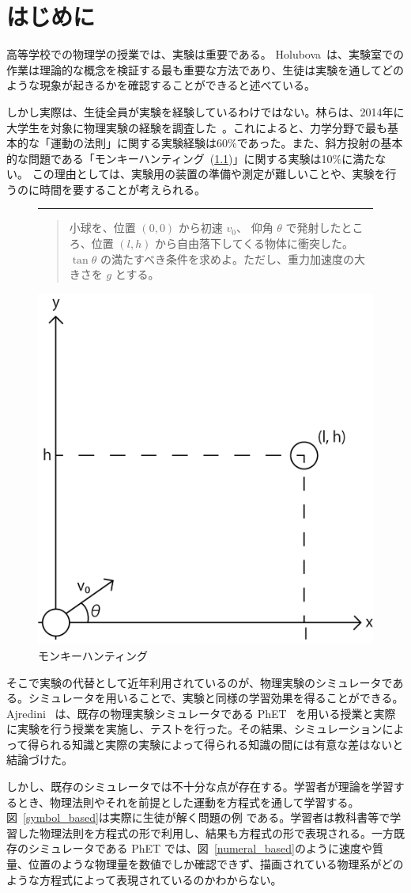 \chapter{はじめに} \label{intro}

高等学校での物理学の授業では、実験は重要である。
Holubova~\cite{holubova_2019}は、実験室での作業は理論的な概念を検証する最も重要な方法であり、生徒は実験を通してどのような現象が起きるかを確認することができると述べている。

しかし実際は、生徒全員が実験を経験しているわけではない。林らは、2014年に大学生を対象に物理実験の経験を調査した~\cite{2015KJ00010038066}。これによると、力学分野で最も基本的な「運動の法則」に関する実験経験は60\%であった。また、斜方投射の基本的な問題である「モンキーハンティング~(\ref{monkey_hunting})」に関する実験は10\%に満たない。
この理由としては、実験用の装置の準備や測定が難しいことや、実験を行うのに時間を要することが考えられる。

\begin{figure}[htb]
\noindent\rule{\linewidth}{0.4pt}
\begin{quote}
小球を、位置 $(0, 0)$ から初速 $v_0$、 仰角 $\theta$ で発射したところ、位置 $(l, h)$ から自由落下してくる物体に衝突した。 $\tan \theta$ の満たすべき条件を求めよ。ただし、重力加速度の大きさを $g$ とする。
\end{quote}
\centering
\includegraphics[width=0.3\linewidth]{work/monkey_hunting.png}
\caption{モンキーハンティング} \label{monkey_hunting}
\end{figure}

そこで実験の代替として近年利用されているのが、物理実験のシミュレータである。シミュレータを用いることで、実験と同様の学習効果を得ることができる。Ajredini~\cite{ajredini_real_2014} は、既存の物理実験シミュレータである PhET~\cite{perkins_phet_2006} を用いる授業と実際に実験を行う授業を実施し、テストを行った。その結果、シミュレーションによって得られる知識と実際の実験によって得られる知識の間には有意な差はないと結論づけた。


しかし、既存のシミュレータでは不十分な点が存在する。学習者が理論を学習するとき、物理法則やそれを前提とした運動を方程式を通して学習する。
図~\ref{symbol_based}は実際に生徒が解く問題の例
である。学習者は教科書等で学習した物理法則を方程式の形で利用し、結果も方程式の形で表現される。一方既存のシミュレータである PhET では、図~\ref{numeral_based}のように速度や質量、位置のような物理量を数値でしか確認できず、描画されている物理系がどのような方程式によって表現されているのかわからない。\\\\


